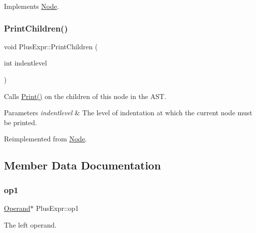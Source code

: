 Implements \hyperlink{class_node_a56e29657306ffb004d69c6929ae44269}{Node}.

\mbox{\label{class_plus_expr_a5ff2d74c543d3dcda4aefb81126e8f51}} 
\subsubsection{\texorpdfstring{Print\+Children()}{PrintChildren()}}
{\footnotesize\ttfamily void Plus\+Expr\+::\+Print\+Children (\begin{DoxyParamCaption}\item[{int}]{indentlevel }\end{DoxyParamCaption})\hspace{0.3cm}{\ttfamily [virtual]}}

Calls \hyperlink{class_node_a9ef727fd72d1a37792b3db60a8a479dd}{Print()} on the children of this node in the A\+ST. 
\begin{DoxyParams}{Parameters}
{\em indentlevel} & The level of indentation at which the current node must be printed. \\
\hline
\end{DoxyParams}


Reimplemented from \hyperlink{class_node_a3e67ec8d22182b721717af14fe0c3000}{Node}.



\subsection{Member Data Documentation}
\mbox{\label{class_plus_expr_ae9a51590eac204790685a49a0b67aaa5}} 
\subsubsection{\texorpdfstring{op1}{op1}}
{\footnotesize\ttfamily \hyperlink{class_operand}{Operand}$\ast$ Plus\+Expr\+::op1\hspace{0.3cm}{\ttfamily [protected]}}

The left operand. \mbox{\label{class_plus_expr_a14d789b288ad156fd5b8908dbca3f62b}} 
